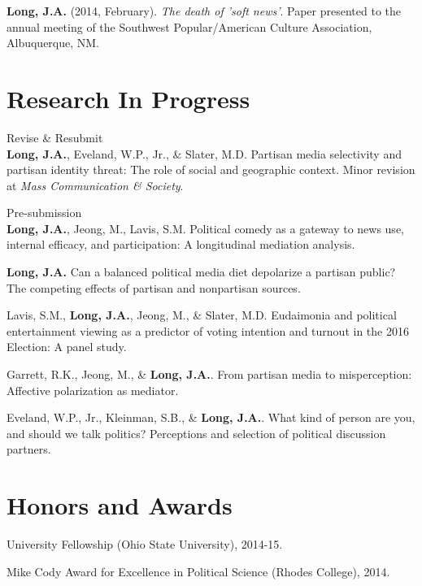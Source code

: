 \documentclass[margin,line]{res}
\begin{document}
\begin{resume}
{\bf Long, J.A.} (2014, February). \emph{The death of 'soft news'}. Paper presented to the annual meeting of the Southwest Popular/American Culture Association, Albuquerque, NM.


\section{\sc Research In Progress} 

{\sc Revise \& Resubmit}\\
{\bf Long, J.A.}, Eveland, W.P., Jr., \& Slater, M.D. Partisan media selectivity and partisan identity threat: The role of social and geographic context. Minor revision at \emph{Mass Communication \& Society}.



{\sc Pre-submission}\\
{\bf Long, J.A.}, Jeong, M., Lavis, S.M. Political comedy as a gateway to news use, internal efficacy, and participation: A longitudinal mediation analysis. 

\textbf{Long, J.A.} Can a balanced political media diet depolarize a partisan public? The competing effects of partisan and nonpartisan sources.

Lavis, S.M., {\bf Long, J.A.}, Jeong, M., \& Slater, M.D. Eudaimonia and political entertainment viewing as a predictor of voting intention and turnout in the 2016 Election: A panel study. 

Garrett, R.K., Jeong, M., \& {\bf Long, J.A.}. From partisan media to misperception: Affective polarization as mediator.

Eveland, W.P., Jr., Kleinman, S.B., \& \textbf{Long, J.A.}. What kind of person are you, and should we talk politics? Perceptions and selection of political discussion partners.

\section{\sc Honors and Awards} 
University Fellowship (Ohio State University), 2014-15.

\vspace*{-2.5mm}
Mike Cody Award for Excellence in Political Science (Rhodes College), 2014.


\end{resume}
\end{document}
